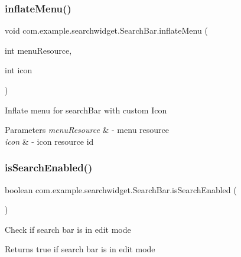 \subsubsection{\texorpdfstring{inflateMenu()}{inflateMenu()}\hspace{0.1cm}{\footnotesize\ttfamily [2/2]}}
{\footnotesize\ttfamily void com.\+example.\+searchwidget.\+Search\+Bar.\+inflate\+Menu (\begin{DoxyParamCaption}\item[{int}]{menu\+Resource,  }\item[{int}]{icon }\end{DoxyParamCaption})}

Inflate menu for search\+Bar with custom Icon


\begin{DoxyParams}{Parameters}
{\em menu\+Resource} & -\/ menu resource \\
\hline
{\em icon} & -\/ icon resource id \\
\hline
\end{DoxyParams}
\mbox{\label{classcom_1_1example_1_1searchwidget_1_1_search_bar_a101525ef181280109b31396c3175c91c}} 
\subsubsection{\texorpdfstring{isSearchEnabled()}{isSearchEnabled()}}
{\footnotesize\ttfamily boolean com.\+example.\+searchwidget.\+Search\+Bar.\+is\+Search\+Enabled (\begin{DoxyParamCaption}{ }\end{DoxyParamCaption})}

Check if search bar is in edit mode

\begin{DoxyReturn}{Returns}
true if search bar is in edit mode 
\end{DoxyReturn}
\mbox{\label{classcom_1_1example_1_1searchwidget_1_1_search_bar_a1bf37ff1703370a852d5573dfffe5daf}} 
